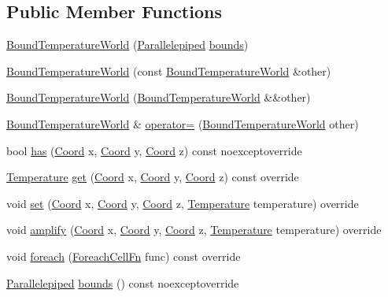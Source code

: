 \subsection*{Public Member Functions}
\begin{DoxyCompactItemize}
\item 
\hyperlink{class_bound_temperature_world_ab1843b429dc37c0c09ef0b454b9ea908}{Bound\-Temperature\-World} (\hyperlink{struct_parallelepiped}{Parallelepiped} \hyperlink{class_bound_temperature_world_a3351693a7d184365da5dfb5d833a0cb6}{bounds})
\item 
\hyperlink{class_bound_temperature_world_ae022092cb3feca841a569a1be7ab650a}{Bound\-Temperature\-World} (const \hyperlink{class_bound_temperature_world}{Bound\-Temperature\-World} \&other)
\item 
\hyperlink{class_bound_temperature_world_ae8406206a559d955ce53d18f4e2ec45b}{Bound\-Temperature\-World} (\hyperlink{class_bound_temperature_world}{Bound\-Temperature\-World} \&\&other)
\item 
\hyperlink{class_bound_temperature_world}{Bound\-Temperature\-World} \& \hyperlink{class_bound_temperature_world_a0501d4803249b0724ee87cd125f81481}{operator=} (\hyperlink{class_bound_temperature_world}{Bound\-Temperature\-World} other)
\item 
bool \hyperlink{class_bound_temperature_world_a75d2d3c631fb355de63dea3961ecd32b}{has} (\hyperlink{struct_coord}{Coord} x, \hyperlink{struct_coord}{Coord} y, \hyperlink{struct_coord}{Coord} z) const noexceptoverride
\item 
\hyperlink{struct_temperature}{Temperature} \hyperlink{class_bound_temperature_world_a1a668e9632e4179029cabad5052428fc}{get} (\hyperlink{struct_coord}{Coord} x, \hyperlink{struct_coord}{Coord} y, \hyperlink{struct_coord}{Coord} z) const override
\item 
void \hyperlink{class_bound_temperature_world_aa069691f31dd38006cfeacab94b6e94e}{set} (\hyperlink{struct_coord}{Coord} x, \hyperlink{struct_coord}{Coord} y, \hyperlink{struct_coord}{Coord} z, \hyperlink{struct_temperature}{Temperature} temperature) override
\item 
void \hyperlink{class_bound_temperature_world_a7b49bd6e07cc78f3c7a3a722d0ec5bac}{amplify} (\hyperlink{struct_coord}{Coord} x, \hyperlink{struct_coord}{Coord} y, \hyperlink{struct_coord}{Coord} z, \hyperlink{struct_temperature}{Temperature} temperature) override
\item 
void \hyperlink{class_bound_temperature_world_afac2a24af176488487ef7aaa62936ee7}{foreach} (\hyperlink{class_i_temperature_world_boundable_mixin_a370c20d79642d15e97843da972d87ba9}{Foreach\-Cell\-Fn} func) const override
\item 
\hyperlink{struct_parallelepiped}{Parallelepiped} \hyperlink{class_bound_temperature_world_a3351693a7d184365da5dfb5d833a0cb6}{bounds} () const noexceptoverride
\end{DoxyCompactItemize}
